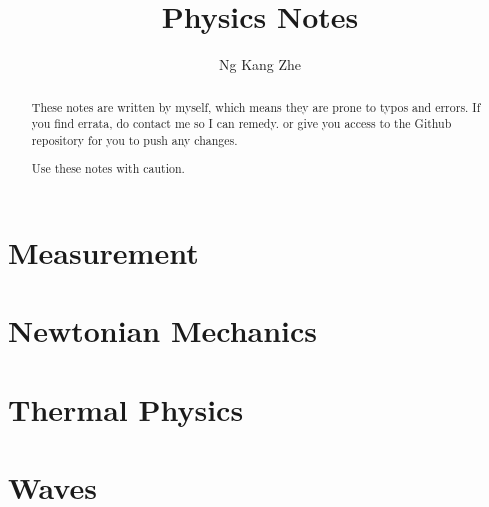 \documentclass[a4paper,10pt]{article}
\title{Physics Notes}
\author{Ng Kang Zhe}
\begin{document}
\maketitle

\begin{abstract}
	These notes are written by myself, which means they are prone to typos and errors. If you find errata, do contact me so I can remedy. or give you access to the Github repository for you to push any changes.
	
	Use these notes with caution.
\end{abstract}

\newpage
{\selectfont
\begin{multicols*}{2}
\part{Measurement}


\part{Newtonian Mechanics}







\part{Thermal Physics}





\part{Waves}


\end{multicols*}
}
\end{document}

